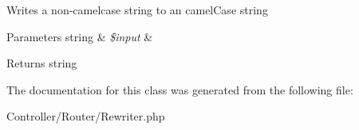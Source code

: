 \label{class_anemo_1_1_controller_1_1_router_1_1_rewriter_ac373a9b942c85bf06e50d77072ceb503}
Writes a non-\/camelcase string to an camelCase string 
\begin{DoxyParams}[1]{Parameters}
string & {\em \$input} & \\
\hline
\end{DoxyParams}
\begin{DoxyReturn}{Returns}
string 
\end{DoxyReturn}


The documentation for this class was generated from the following file:\begin{DoxyCompactItemize}
\item 
Controller/Router/Rewriter.php\end{DoxyCompactItemize}
